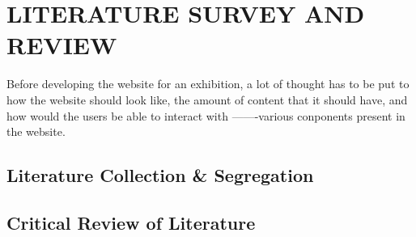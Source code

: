 
\chapter{LITERATURE SURVEY AND REVIEW} %
\label{ChapterLiteratureSurvey} %

Before developing the website for an exhibition, a lot of thought has to be put to how the website should look like, the amount of content that it should have, and how would the users be able to interact with -------various conponents present in the website. 

\section{Literature Collection \& Segregation}


\section{Critical Review of Literature}

